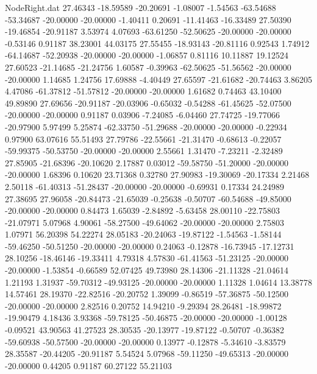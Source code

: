 \begin{filecontents}{NodeRight.dat}
  27.46343  -18.59589  -20.20691    -1.08007   -1.54563  -63.54688  -53.34687  -20.00000  -20.00000   -1.40411    0.20691  -11.41463  -16.33489
  27.50390  -19.46854  -20.91187     3.53974    4.07693  -63.61250  -52.50625  -20.00000  -20.00000   -0.53146    0.91187   38.23001   44.03175
  27.55455  -18.93143  -20.81116     0.92543    1.74912  -64.14687  -52.20938  -20.00000  -20.00000   -1.06857    0.81116   10.11887   19.12524
  27.60523  -21.14685  -21.24756     1.60587   -0.39963  -62.50625  -51.56562  -20.00000  -20.00000    1.14685    1.24756   17.69888   -4.40449
  27.65597  -21.61682  -20.74463     3.86205    4.47086  -61.37812  -51.57812  -20.00000  -20.00000    1.61682    0.74463   43.10400   49.89890
  27.69656  -20.91187  -20.03906    -0.65032   -0.54288  -61.45625  -52.07500  -20.00000  -20.00000    0.91187    0.03906   -7.24085   -6.04460
  27.74725  -19.77066  -20.97900     5.97499    5.25874  -62.33750  -51.29688  -20.00000  -20.00000   -0.22934    0.97900   63.07616   55.51493
  27.79786  -22.55661  -21.31470    -0.68613   -0.22057  -59.99375  -50.53750  -20.00000  -20.00000    2.55661    1.31470   -7.23211   -2.32489
  27.85905  -21.68396  -20.10620     2.17887    0.03012  -59.58750  -51.20000  -20.00000  -20.00000    1.68396    0.10620   23.71368    0.32780
  27.90983  -19.30069  -20.17334     2.21468    2.50118  -61.40313  -51.28437  -20.00000  -20.00000   -0.69931    0.17334   24.24989   27.38695
  27.96058  -20.84473  -21.65039    -0.25638   -0.50707  -60.54688  -49.85000  -20.00000  -20.00000    0.84473    1.65039   -2.84892   -5.63458
  28.00110  -22.75803  -21.07971     5.07968    4.90061  -58.27500  -49.64062  -20.00000  -20.00000    2.75803    1.07971   56.20398   54.22274
  28.05183  -20.24063  -19.87122    -1.54563   -1.58144  -59.46250  -50.51250  -20.00000  -20.00000    0.24063   -0.12878  -16.73945  -17.12731
  28.10256  -18.46146  -19.33411     4.79318    4.57830  -61.41563  -51.23125  -20.00000  -20.00000   -1.53854   -0.66589   52.07425   49.73980
  28.14306  -21.11328  -21.04614     1.21193    1.31937  -59.70312  -49.93125  -20.00000  -20.00000    1.11328    1.04614   13.38778   14.57461
  28.19370  -22.82516  -20.20752     1.39099   -0.86519  -57.36875  -50.12500  -20.00000  -20.00000    2.82516    0.20752   14.94210   -9.29394
  28.26481  -18.99872  -19.90479     4.18436    3.93368  -59.78125  -50.46875  -20.00000  -20.00000   -1.00128   -0.09521   43.90563   41.27523
  28.30535  -20.13977  -19.87122    -0.50707   -0.36382  -59.60938  -50.57500  -20.00000  -20.00000    0.13977   -0.12878   -5.34610   -3.83579
  28.35587  -20.44205  -20.91187     5.54524    5.07968  -59.11250  -49.65313  -20.00000  -20.00000    0.44205    0.91187   60.27122   55.21103

\end{filecontents}
